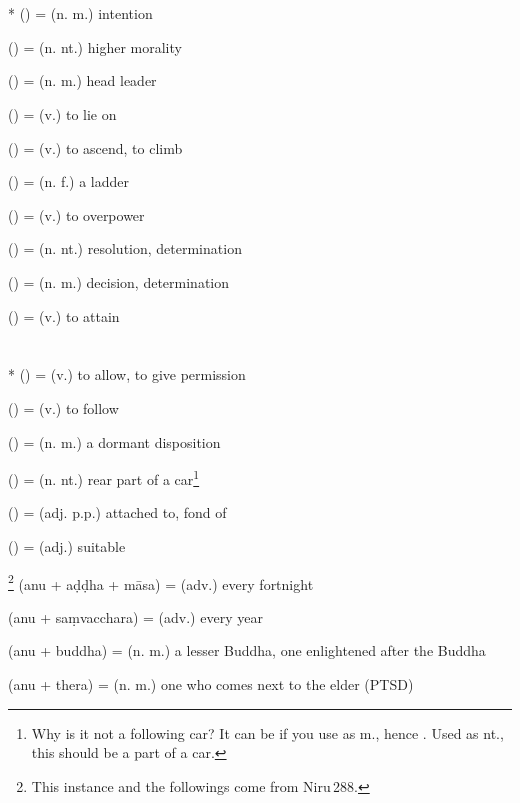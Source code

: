 \section*{}\label{upasagga:adhi}
\begin{compactitem}
\item {}* () = (n. m.) intention
\item {} () = (n. nt.) higher morality
\item {} () = (n. m.) head leader
\item {} () = (v.) to lie on 
\item {} () = (v.) to ascend, to climb
\item {} () = (n. f.) a ladder
\item {} () = (v.) to overpower
\item {} () = (n. nt.) resolution, determination
\item {} () = (n. m.) decision, determination 
\item {} () = (v.) to attain 
\end{compactitem}

\section*{}\label{upasagga:anu}
\begin{compactitem}
\item {}* () = (v.) to allow, to give permission
\item {} () = (v.) to follow 
\item {} () = (n. m.) a dormant disposition 
\item {} () = (n. nt.) rear part of a car\footnote{Why is it not a following car? It can be if you use as m., hence . Used as nt., this should be a part of a car.}
\item {} () = (adj. p.p.) attached to, fond of
\item {} () = (adj.) suitable
\item {}\footnote{This instance and the followings come from Niru\,288.} (anu + a\d d\d dha + m\=asa) = (adv.) every fortnight
\item {} (anu + sa\d mvacchara) = (adv.) every year
\item {} (anu + buddha) = (n. m.) a lesser Buddha, one enlightened after the Buddha
\item {} (anu + thera) = (n. m.) one who comes next to the elder (PTSD)
\end{compactitem}

